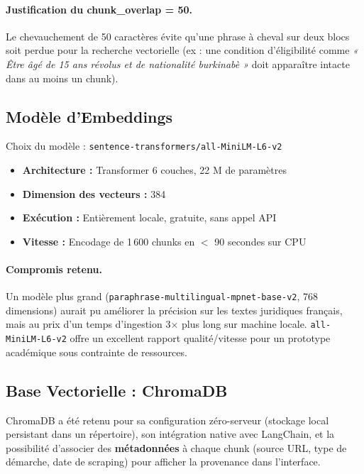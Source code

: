 \documentclass[12pt, a4paper]{article}
\begin{document}
\paragraph{Justification du chunk\_overlap = 50.}
Le chevauchement de 50 caractères évite qu'une phrase à cheval sur deux blocs soit perdue pour la recherche vectorielle (ex : une condition d'éligibilité comme \emph{« Être âgé de 15 ans révolus et de nationalité burkinabè »} doit apparaître intacte dans au moins un chunk).

\subsection{Modèle d'Embeddings}

\begin{infobox}{Choix du modèle : \texttt{sentence-transformers/all-MiniLM-L6-v2}}
\begin{itemize}[noitemsep]
  \item \textbf{Architecture :} Transformer 6 couches, 22 M de paramètres
  \item \textbf{Dimension des vecteurs :} 384
  \item \textbf{Exécution :} Entièrement locale, gratuite, sans appel API
  \item \textbf{Vitesse :} Encodage de 1\,600 chunks en $<$ 90 secondes sur CPU
\end{itemize}
\end{infobox}

\paragraph{Compromis retenu.}
Un modèle plus grand (\texttt{paraphrase-multilingual-mpnet-base-v2}, 768 dimensions) aurait pu améliorer la précision sur les textes juridiques français, mais au prix d'un temps d'ingestion 3× plus long sur machine locale. \texttt{all-MiniLM-L6-v2} offre un excellent rapport qualité/vitesse pour un prototype académique sous contrainte de ressources.


\subsection{Base Vectorielle : ChromaDB}

ChromaDB a été retenu pour sa configuration zéro-serveur (stockage local persistant dans un répertoire), son intégration native avec LangChain, et la possibilité d'associer des \textbf{métadonnées} à chaque chunk (source URL, type de démarche, date de scraping) pour afficher la provenance dans l'interface.
\end{document}
